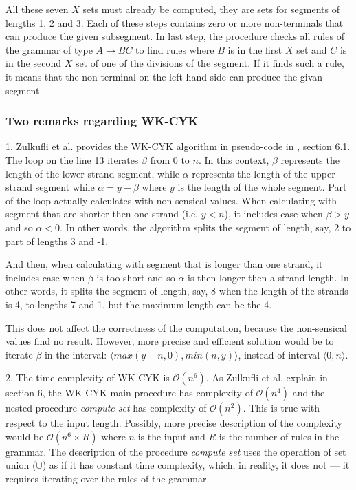 All these seven $X$ sets must already be computed, they are sets for segments of lengths 1, 2 and 3. Each of these steps contains zero or more non-terminals that can produce the given subsegment. In last step, the procedure checks all rules of the grammar of type $A \rightarrow BC$ to find rules where $B$ is in the first $X$ set and $C$ is in the second $X$ set of one of the divisions of the segment. If it finds such a rule, it means that the non-terminal on the left-hand side can produce the givan segment.


\subsubsection{Two remarks regarding WK-CYK}
1. Zulkufli et al. provides the WK-CYK algorithm in pseudo-code in \cite{WK_CYK}, section 6.1. The loop on the line 13 iterates $\beta$ from 0 to $n$. In this context, $\beta$ represents the length of the lower strand segment, while $\alpha$ represents the length of the upper strand segment while $\alpha = y - \beta$ where $y$ is the length of the whole segment. Part of the loop actually calculates with non-sensical values. When calculating with segment that are shorter then one strand (i.e. $y < n$), it includes case when $\beta > y$ and so $\alpha < 0$. In other words, the algorithm splits the segment of length, say, 2 to part of lengths 3 and -1.

And then, when calculating with segment that is longer than one strand, it includes case when $\beta$ is too short and so $\alpha$ is then longer then a strand length. In other words, it splits the segment of length, say, 8 when the length of the strands is 4, to lengths 7 and 1, but the maximum length can be the 4.

This does not affect the correctness of the computation, because the non-sensical values find no result. However, more precise and efficient solution would be to iterate $\beta$ in the interval: $\langle max(y-n, 0), min(n, y)\rangle$, instead of interval $\langle 0, n\rangle$.

\medskip

2. The time complexity of WK-CYK is $\mathcal{O}(n^6)$. As Zulkufli et al. \cite{WK_CYK} explain in section 6, the WK-CYK main procedure has complexity of $\mathcal{O}(n^4)$ and the nested procedure \textit{compute set} has complexity of $\mathcal{O}(n^2)$. This is true with respect to the input length. Possibly, more precise description of the complexity would be $\mathcal{O}(n^6 \times R)$ where $n$ is the input and $R$ is the number of rules in the grammar. The description of the procedure \textit{compute set} uses the operation of set union ($\cup$) as if it has constant time complexity, which, in reality, it does not --- it requires iterating over the rules of the grammar.


